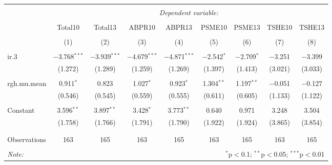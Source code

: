 \documentclass[a4paper, landscape]{article}
\begin{document}
\begin{table}[!htbp] \centering 
  \caption{} 
  \label{} 
\begin{tabular}{@{\extracolsep{5pt}}lcccccccc} 
\\[-1.8ex]\hline 
\hline \\[-1.8ex] 
 & \multicolumn{8}{c}{\textit{Dependent variable:}} \\ 
\cline{2-9} 
\\[-1.8ex] & Total10 & Total13 & ABPR10 & ABPR13 & PSME10 & PSME13 & TSHE10 & TSHE13 \\ 
\\[-1.8ex] & (1) & (2) & (3) & (4) & (5) & (6) & (7) & (8)\\ 
\hline \\[-1.8ex] 
 ir.3 & $-$3.768$^{***}$ & $-$3.939$^{***}$ & $-$4.679$^{***}$ & $-$4.871$^{***}$ & $-$2.542$^{*}$ & $-$2.709$^{*}$ & $-$3.251 & $-$3.399 \\ 
  & (1.272) & (1.289) & (1.259) & (1.269) & (1.397) & (1.413) & (3.021) & (3.033) \\ 
  & & & & & & & & \\ 
 rgh.mu.mean & 0.911$^{*}$ & 0.823 & 1.027$^{*}$ & 0.923$^{*}$ & 1.304$^{**}$ & 1.197$^{**}$ & $-$0.051 & $-$0.127 \\ 
  & (0.546) & (0.545) & (0.559) & (0.555) & (0.611) & (0.605) & (1.133) & (1.122) \\ 
  & & & & & & & & \\ 
 Constant & 3.596$^{**}$ & 3.897$^{**}$ & 3.428$^{*}$ & 3.773$^{**}$ & 0.640 & 0.971 & 3.248 & 3.504 \\ 
  & (1.758) & (1.766) & (1.791) & (1.790) & (1.922) & (1.924) & (3.865) & (3.854) \\ 
  & & & & & & & & \\ 
\hline \\[-1.8ex] 
Observations & 163 & 165 & 163 & 165 & 163 & 165 & 163 & 165 \\ 
\hline 
\hline \\[-1.8ex] 
\textit{Note:}  & \multicolumn{8}{r}{$^{*}$p$<$0.1; $^{**}$p$<$0.05; $^{***}$p$<$0.01} \\ 
\end{tabular} 
\end{table} 
\end{document}
